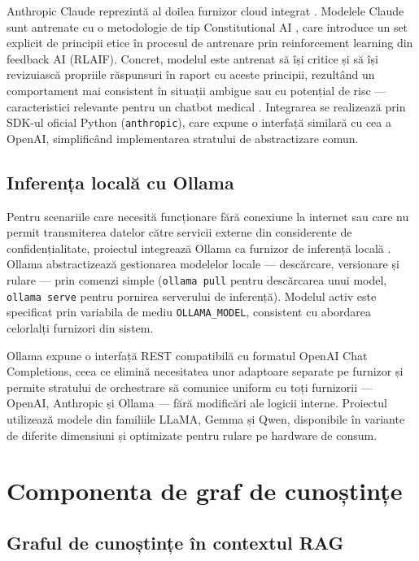 \documentclass[12pt, a4paper, oneside, romanian]{teza-upb}
\begin{document}
Anthropic Claude reprezintă al doilea furnizor cloud integrat \cite{anthropic_claude}. 
Modelele Claude sunt antrenate cu o metodologie de tip Constitutional AI 
\cite{bai2022constitutional}, care introduce un set explicit de principii etice 
în procesul de antrenare prin reinforcement learning din feedback AI (RLAIF). 
Concret, modelul este antrenat să își critice și să își revizuiască propriile 
răspunsuri în raport cu aceste principii, rezultând un comportament mai 
consistent în situații ambigue sau cu potențial de risc — caracteristici 
relevante pentru un chatbot medical \cite{bai2022constitutional}. Integrarea 
se realizează prin SDK-ul oficial Python (\texttt{anthropic}), care expune 
o interfață similară cu cea a OpenAI, simplificând implementarea stratului 
de abstractizare comun.

\subsection{Inferența locală cu Ollama}

Pentru scenariile care necesită funcționare fără conexiune la internet sau care 
nu permit transmiterea datelor către servicii externe din considerente de 
confidențialitate, proiectul integrează Ollama ca furnizor de inferență locală 
\cite{ollama_doc}. Ollama abstractizează gestionarea modelelor locale — 
descărcare, versionare și rulare — prin comenzi simple (\texttt{ollama pull} 
pentru descărcarea unui model, \texttt{ollama serve} pentru pornirea serverului 
de inferență). Modelul activ este specificat prin variabila de mediu 
\texttt{OLLAMA\_MODEL}, consistent cu abordarea celorlalți furnizori din sistem.

Ollama expune o interfață REST compatibilă cu formatul OpenAI Chat Completions, 
ceea ce elimină necesitatea unor adaptoare separate pe furnizor și permite 
stratului de orchestrare să comunice uniform cu toți furnizorii — OpenAI, 
Anthropic și Ollama — fără modificări ale logicii interne. Proiectul utilizează 
modele din familiile LLaMA, Gemma și Qwen, disponibile în variante de diferite 
dimensiuni și optimizate pentru rulare pe hardware de consum.
\section{Componenta de graf de cunoștințe}

\subsection{Graful de cunoștințe în contextul RAG}
\end{document}
